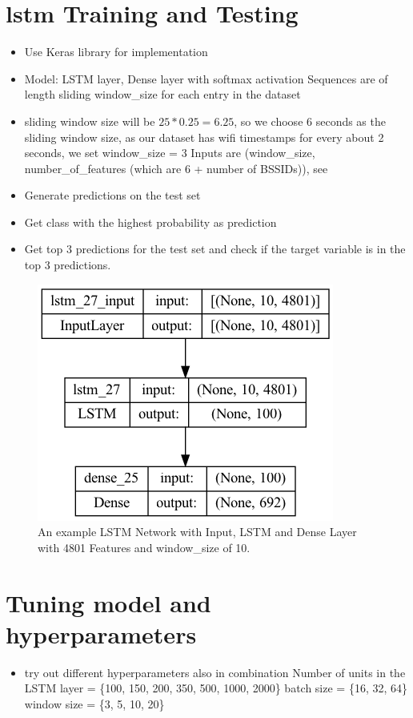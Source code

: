 \section{\ac{lstm} Training and Testing}
\begin{itemize}
    \item Use Keras library for implementation \cite{keras}
    \item Model: LSTM layer, Dense layer with softmax activation
    \subitem Sequences are of length sliding window\_size for each entry in the dataset 
    \item sliding window size will be \(25 * 0.25 = 6.25\), so we choose 6 seconds as the sliding window size, as our dataset has \ac{wifi} timestamps for every about 2 seconds, we set window\_size = 3 \cite{EffectsSlidingWindow2022}
    \subitem Inputs are (window\_size, number\_of\_features (which are 6 + number of BSSIDs)), see 
    \item Generate predictions on the test set
    \item Get class with the highest probability as prediction
    \item Get top 3 predictions for the test set and check if the target variable is in the top 3 predictions.
\end{itemize}

\begin{figure}[h!]
    \centering
    \includegraphics[scale=0.5]{images/model_plot.png}
    \caption{An example LSTM Network with Input, LSTM and Dense Layer with 4801 Features and window\_size of 10.}
    \label{fig:lstm_architecture}
\end{figure}

\section{Tuning model and hyperparameters}
\begin{itemize}
    \item try out different hyperparameters also in combination
    \subitem Number of units in the LSTM layer = \{100, 150, 200, 350, 500, 1000, 2000\}
    \subitem batch size = \{16, 32, 64\}
    \subitem window size = \{3, 5, 10, 20\}
\end{itemize}

